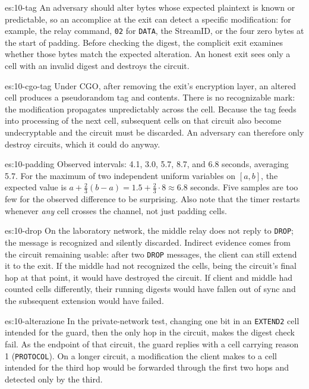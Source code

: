 \begin{soluzione}{es:10-tag}
An adversary should alter bytes whose expected plaintext is known or predictable, so an accomplice at the exit can detect a specific modification: for example, the relay command, \texttt{02} for \texttt{DATA}, the StreamID, or the four zero bytes at the start of padding. Before checking the digest, the complicit exit examines whether those bytes match the expected alteration. An honest exit sees only a cell with an invalid digest and destroys the circuit.
\end{soluzione}

\begin{soluzione}{es:10-cgo-tag}
Under CGO, after removing the exit's encryption layer, an altered cell produces a pseudorandom tag and contents. There is no recognizable mark: the modification propagates unpredictably across the cell. Because the tag feeds into processing of the next cell, subsequent cells on that circuit also become undecryptable and the circuit must be discarded. An adversary can therefore only destroy circuits, which it could do anyway.
\end{soluzione}

\begin{soluzione}{es:10-padding}
Observed intervals: 4.1, 3.0, 5.7, 8.7, and 6.8 seconds, averaging 5.7. For the maximum of two independent uniform variables on $[a, b]$, the expected value is $a + \tfrac{2}{3}(b - a) = 1.5 + \tfrac{2}{3} \cdot 8 \approx 6.8$ seconds. Five samples are too few for the observed difference to be surprising. Also note that the timer restarts whenever \emph{any} cell crosses the channel, not just padding cells.
\end{soluzione}

\begin{soluzione}{es:10-drop}
On the laboratory network, the middle relay does not reply to \texttt{DROP}; the message is recognized and silently discarded. Indirect evidence comes from the circuit remaining usable: after two \texttt{DROP} messages, the client can still extend it to the exit. If the middle had not recognized the cells, being the circuit's final hop at that point, it would have destroyed the circuit. If client and middle had counted cells differently, their running digests would have fallen out of sync and the subsequent extension would have failed.
\end{soluzione}

\begin{soluzione}{es:10-alterazione}
In the private-network test, changing one bit in an \texttt{EXTEND2} cell intended for the guard, then the only hop in the circuit, makes the digest check fail. As the endpoint of that circuit, the guard replies with a  cell carrying reason 1 (\texttt{PROTOCOL}). On a longer circuit, a modification the client makes to a cell intended for the third hop would be forwarded through the first two hops and detected only by the third.
\end{soluzione}
